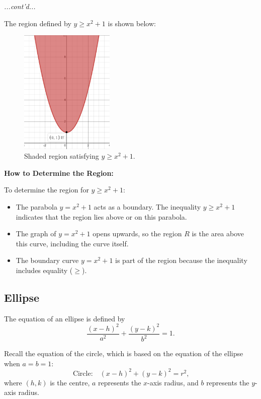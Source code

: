 \documentclass{article}
\begin{document}
\begin{examplebox}
\textit{...cont'd...}
\begin{solutionbox}
    The region defined by \( y \geq x^2 + 1 \) is shown below:

    \begin{blankbox}
        \begin{figure}[H]
            \centering
            \includegraphics[width=0.4\textwidth]{y = x^2 + 1 shaded.png}
            \caption{Shaded region satisfying \( y \geq x^2 + 1 \).}
            \label{fig:region}
        \end{figure}
    \end{blankbox}
    
    \textbf{How to Determine the Region:}
    \begin{conceptbox}
    To determine the region for \( y \geq x^2 + 1 \):
    \begin{itemize}
        \item The parabola \( y = x^2 + 1 \) acts as a boundary. The inequality \( y \geq x^2 + 1 \) indicates that the region lies above or on this parabola.
        \item The graph of \( y = x^2 + 1 \) opens upwards, so the region \( R \) is the area above this curve, including the curve itself.
        \item The boundary curve \( y = x^2 + 1 \) is part of the region because the inequality includes equality (\( \geq \)).
    \end{itemize}
    \end{conceptbox}
\end{solutionbox}    
\end{examplebox}

\subsection*{Ellipse}
\begin{definitionbox}
The equation of an ellipse is defined by
\[
    \dfrac{(x - h)^2}{a^2} + \dfrac{(y - k)^2}{b^2} = 1 \text{.}
\]
\begin{remarkbox}
Recall the equation of the circle, which is based on the equation of the ellipse when \( a = b = 1 \):
\[
    \text{Circle:} \quad (x - h)^2 + (y - k)^2 = r^2 \text{,}
\]
where \( (h, k) \) is the centre, \( a \) represents the \( x \)-axis radius, and \( b \) represents the \( y \)-axis radius.
\end{remarkbox}
\end{definitionbox}
\end{document}
